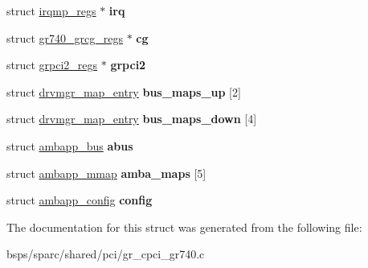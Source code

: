 \begin{DoxyCompactItemize}
struct \mbox{\hyperlink{structirqmp__regs}{irqmp\+\_\+regs}} $\ast$ {\bfseries irq}
\item 
\mbox{\label{structgr__cpci__gr740__priv_a0b2e83969771aef5bc552b1a3c4cfc9f}} 
struct \mbox{\hyperlink{structgr740__grcg__regs}{gr740\+\_\+grcg\+\_\+regs}} $\ast$ {\bfseries cg}
\item 
\mbox{\label{structgr__cpci__gr740__priv_a2d524a8c603f6f5f5c3177e4570438d8}} 
struct \mbox{\hyperlink{structgrpci2__regs}{grpci2\+\_\+regs}} $\ast$ {\bfseries grpci2}
\item 
\mbox{\label{structgr__cpci__gr740__priv_adcdbab4eb0651378000ce57ea3a49b4e}} 
struct \mbox{\hyperlink{structdrvmgr__map__entry}{drvmgr\+\_\+map\+\_\+entry}} {\bfseries bus\+\_\+maps\+\_\+up} \mbox{[}2\mbox{]}
\item 
\mbox{\label{structgr__cpci__gr740__priv_a721f865ef93913ef8f0b5d863186da5e}} 
struct \mbox{\hyperlink{structdrvmgr__map__entry}{drvmgr\+\_\+map\+\_\+entry}} {\bfseries bus\+\_\+maps\+\_\+down} \mbox{[}4\mbox{]}
\item 
\mbox{\label{structgr__cpci__gr740__priv_a0a0e59f7c64801f9a8dbee636c56a975}} 
struct \mbox{\hyperlink{structambapp__bus}{ambapp\+\_\+bus}} {\bfseries abus}
\item 
\mbox{\label{structgr__cpci__gr740__priv_a61ffb93d5b9113550616871967526107}} 
struct \mbox{\hyperlink{structambapp__mmap}{ambapp\+\_\+mmap}} {\bfseries amba\+\_\+maps} \mbox{[}5\mbox{]}
\item 
\mbox{\label{structgr__cpci__gr740__priv_a143ff4df3b7b0047a29f14141a42c008}} 
struct \mbox{\hyperlink{structambapp__config}{ambapp\+\_\+config}} {\bfseries config}
\end{DoxyCompactItemize}


The documentation for this struct was generated from the following file\+:\begin{DoxyCompactItemize}
\item 
bsps/sparc/shared/pci/gr\+\_\+cpci\+\_\+gr740.\+c\end{DoxyCompactItemize}
